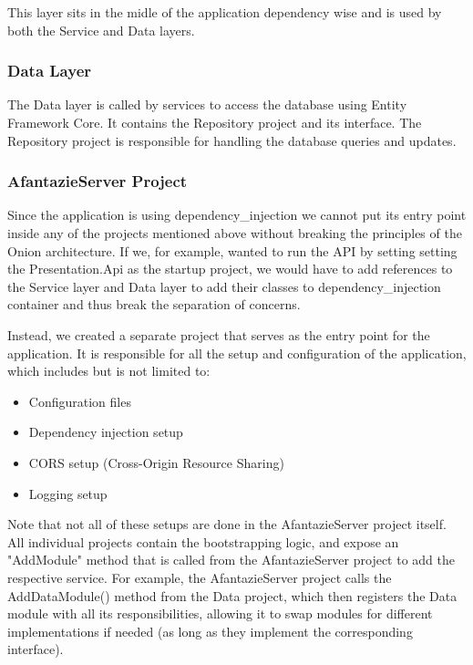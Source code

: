 This layer sits in the midle of the application dependency wise and is used by both the Service and Data layers.

\subsubsection*{Data Layer}
The Data layer is called by services to access the database using Entity Framework Core.
It contains the Repository project and its interface.
The Repository project is responsible for handling the database queries and updates.

\subsubsection*{AfantazieServer Project}
Since the application is using \gls{dependency_injection}
we cannot put its entry point inside any of the projects mentioned above without breaking the principles of the Onion architecture.
If we, for example, wanted to run the API by setting setting the Presentation.Api as the startup project, we would have to add
references to the Service layer and Data layer to add their classes to \gls{dependency_injection} container and thus break the separation of concerns.

Instead, we created a separate project that serves as the entry point for the application.
It is responsible for all the setup and configuration of the application, which includes but is not limited to:
\begin{itemize}
    \item Configuration files 
    \item Dependency injection setup
    \item CORS setup (Cross-Origin Resource Sharing)
    \item Logging setup
\end{itemize}

Note that not all of these setups are done in the AfantazieServer project itself.
All individual projects contain the bootstrapping logic, and expose an "AddModule" method that is called from the AfantazieServer project to add the respective service.
For example, the AfantazieServer project calls the AddDataModule() method from the Data project,
which then registers the Data module with all its responsibilities, allowing it to swap modules for different implementations if needed
(as long as they implement the corresponding interface).


